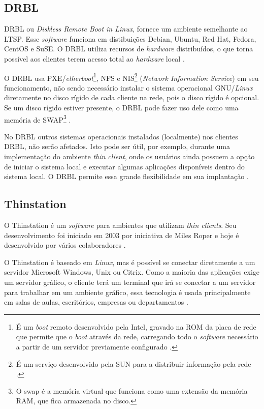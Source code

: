 \documentclass[
	12pt,				%
	openright,			%
	twoside,			%
	a4paper,			%
	chapter=TITLE,		%
	english,			%
	brazil				%
	]{abntex2}
\begin{document}
\subsection{DRBL}

DRBL ou \textit{Diskless Remote Boot in Linux}, fornece um ambiente semelhante ao LTSP. Esse \textit{software} funciona em distibuições Debian, Ubuntu, Red Hat, Fedora, CentOS e SuSE. O DRBL utiliza recursos de \textit{hardware} distribuídos, o que torna possível aos clientes terem acesso total ao \textit{hardware} local \cite{drbl}.

O DRBL usa PXE/\textit{etherboot}\footnote{É um \textit{boot} remoto desenvolvido pela Intel, gravado na ROM da placa de rede que permite que o \textit{boot} através da rede, carregando todo o \textit{software} necessário a partir de um servidor previamente configurado \cite{pxe}.}, NFS e NIS\footnote{É um serviço desenvolvido pela SUN para a distribuir informação pela rede \cite{nis}.} (\textit{Network Information Service}) em seu funcionamento, não sendo necessário instalar o sistema operacional GNU/\textit{Linux} diretamente no disco rígido de cada cliente na rede, pois o disco rígido é opcional. Se um disco rígido estiver presente, o DRBL pode fazer uso dele como uma memória de SWAP\footnote{O swap é a memória virtual que funciona como uma extensão da memória RAM, que fica armazenada no disco.} \cite{drbl,piaui,Frank.drbl}.

No DRBL outros sistemas operacionais instalados (localmente) nos clientes DRBL, não serão afetados. Isto pode ser útil, por exemplo, durante uma implementação do ambiente \textit{thin client}, onde os usuários ainda possuem a opção de iniciar o sistema local e executar algumas aplicações disponíveis dentro do sistema local. O DRBL permite essa grande flexibilidade em sua implantação \cite{drbl}.

\subsection{Thinstation}

O Thinstation é um \textit{software} para ambientes que utilizam \textit{thin clients}. Seu desenvolvimento foi iniciado em 2003 por iniciativa de Miles Roper e hoje é desenvolvido por vários colaboradores \cite{Thinstationl,piaui}.

O Thinstation é baseado em \textit{Linux}, mas é possível se conectar diretamente a um servidor Microsoft Windows, Unix ou Citrix. Como a maioria das aplicações exige um servidor gráfico, o cliente terá um terminal que irá se conectar a um servidor para trabalhar em um ambiente gráfico, essa tecnologia é usada principalmente em salas de aulas, escritórios, empresas ou departamentos \cite{Thinstationl}.
\end{document}
